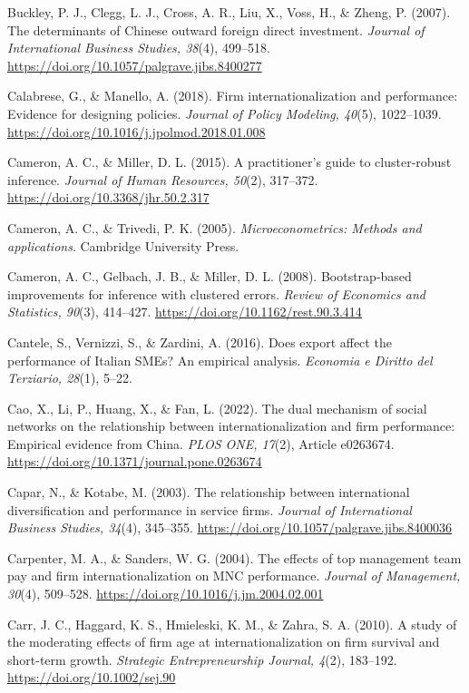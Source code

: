 \documentclass[
  a4paper,
  13pt]{extreport}
\begin{document}
Buckley, P. J., Clegg, L. J., Cross, A. R., Liu, X., Voss, H., \& Zheng,
P. (2007). The determinants of Chinese outward foreign direct
investment. \emph{Journal of International Business Studies, 38}(4),
499--518. \url{https://doi.org/10.1057/palgrave.jibs.8400277}

Calabrese, G., \& Manello, A. (2018). Firm internationalization and
performance: Evidence for designing policies. \emph{Journal of Policy
Modeling, 40}(5), 1022--1039.
\url{https://doi.org/10.1016/j.jpolmod.2018.01.008}

Cameron, A. C., \& Miller, D. L. (2015). A practitioner's guide to
cluster-robust inference. \emph{Journal of Human Resources, 50}(2),
317--372. \url{https://doi.org/10.3368/jhr.50.2.317}

Cameron, A. C., \& Trivedi, P. K. (2005). \emph{Microeconometrics:
Methods and applications}. Cambridge University Press.

Cameron, A. C., Gelbach, J. B., \& Miller, D. L. (2008). Bootstrap-based
improvements for inference with clustered errors. \emph{Review of
Economics and Statistics, 90}(3), 414--427.
\url{https://doi.org/10.1162/rest.90.3.414}

Cantele, S., Vernizzi, S., \& Zardini, A. (2016). Does export affect the
performance of Italian SMEs? An empirical analysis. \emph{Economia e
Diritto del Terziario, 28}(1), 5--22.

Cao, X., Li, P., Huang, X., \& Fan, L. (2022). The dual mechanism of
social networks on the relationship between internationalization and
firm performance: Empirical evidence from China. \emph{PLOS ONE, 17}(2),
Article e0263674. \url{https://doi.org/10.1371/journal.pone.0263674}

Capar, N., \& Kotabe, M. (2003). The relationship between international
diversification and performance in service firms. \emph{Journal of
International Business Studies, 34}(4), 345--355.
\url{https://doi.org/10.1057/palgrave.jibs.8400036}

Carpenter, M. A., \& Sanders, W. G. (2004). The effects of top
management team pay and firm internationalization on MNC performance.
\emph{Journal of Management, 30}(4), 509--528.
\url{https://doi.org/10.1016/j.jm.2004.02.001}

Carr, J. C., Haggard, K. S., Hmieleski, K. M., \& Zahra, S. A. (2010). A
study of the moderating effects of firm age at internationalization on
firm survival and short-term growth. \emph{Strategic Entrepreneurship
Journal, 4}(2), 183--192. \url{https://doi.org/10.1002/sej.90}
\end{document}
